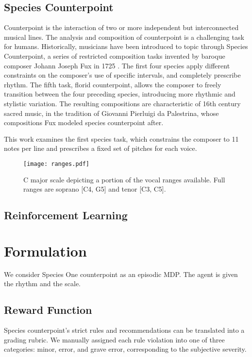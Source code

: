 \documentclass{article}
\begin{document}
    \subsection{Species Counterpoint}
    
    Counterpoint is the interaction of two or more independent but interconnected musical lines. The analysis and composition of counterpoint is a challenging task for humans. Historically, musicians have been introduced to topic through Species Counterpoint, a series of restricted composition tasks invented by baroque composer Johann Joseph Fux in 1725 \cite{Davidian2015}. The first four species apply different constraints on the composer's use of specific intervals, and completely prescribe rhythm. The fifth task, florid counterpoint, allows the composer to freely transition between the four preceding species, introducing more rhythmic and stylistic variation. The resulting compositions are characteristic of 16th century sacred music, in the tradition of Giovanni Pierluigi da Palestrina, whose compositions Fux modeled species counterpoint after.
    
    This work examines the first species task, which constrains the composer to 11 notes per line and prescribes a fixed set of pitches for each voice.
    \begin{figure}
        \texttt{[image: ranges.pdf]}
        \caption{C major scale depicting a portion of the vocal ranges available. Full ranges are soprano [C4, G5] and tenor [C3, C5].}
    \end{figure}
    
    \subsection{Reinforcement Learning}
    \section{Formulation}
    We consider Species One counterpoint as an episodic MDP. The agent is given the rhythm and the scale.
    
    \subsection{Reward Function}
    Species counterpoint's strict rules and recommendations can be translated into a grading rubric. We manually assigned each rule violation into one of three categories: minor, error, and grave error, corresponding to the subjective severity. 
    
\end{document}
